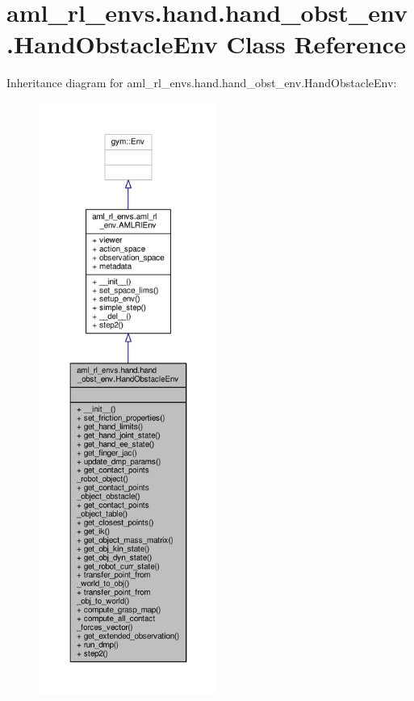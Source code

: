 \hypertarget{classaml__rl__envs_1_1hand_1_1hand__obst__env_1_1_hand_obstacle_env}{\section{aml\-\_\-rl\-\_\-envs.\-hand.\-hand\-\_\-obst\-\_\-env.\-Hand\-Obstacle\-Env Class Reference}
\label{classaml__rl__envs_1_1hand_1_1hand__obst__env_1_1_hand_obstacle_env}
}


Inheritance diagram for aml\-\_\-rl\-\_\-envs.\-hand.\-hand\-\_\-obst\-\_\-env.\-Hand\-Obstacle\-Env\-:
\nopagebreak
\begin{figure}[H]
\begin{center}
\leavevmode
\includegraphics[height=550pt]{classaml__rl__envs_1_1hand_1_1hand__obst__env_1_1_hand_obstacle_env__inherit__graph}
\end{center}
\end{figure}


